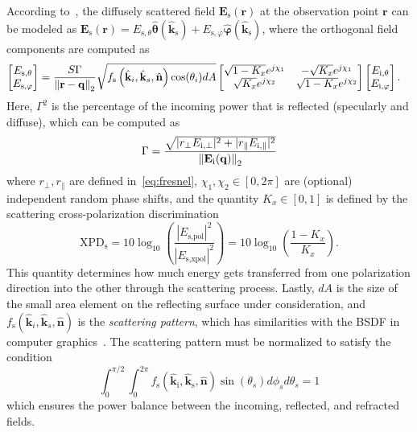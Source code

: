 According to~\cite[Eq.~9]{5979177}, the diffusely scattered field $\mathbf{E}_\text{s}(\mathbf{r})$ at the observation point $\mathbf{r}$ can be modeled as $\mathbf{E}_\text{s}(\mathbf{r})=E_{\text{s}, \theta}\hat{\boldsymbol{\theta}}(\hat{\mathbf{k}}_\text{s}) + E_{\text{s}, \varphi}\hat{\boldsymbol{\varphi}}(\hat{\mathbf{k}}_\text{s})$, where the orthogonal field components are computed as
\begin{align}
    \label{eq:scattered_field}
    \begin{bmatrix}E_{\text{s}, \theta} \\ E_{\text{s}, \varphi}
    \end{bmatrix} &= \frac{S \Gamma}{\left\lVert\mathbf{r} - \mathbf{q}
   \right\rVert_2}  \sqrt{f_\text{s}\left(\hat{\mathbf{k}}_i, \hat{\mathbf{k}}_s,
    \hat{\mathbf{n}}\right) \cos(\theta_i)dA}
    \begin{bmatrix} \sqrt{1-K_x}e^{j\chi_1} & -\sqrt{K_x}e^{j\chi_1} \\
    \sqrt{K_x}e^{j\chi_2} & \sqrt{1-K_x} e^{j\chi_2} \end{bmatrix}
    \begin{bmatrix}E_{\text{i}, \theta} \\ E_{\text{i}, \varphi}
    \end{bmatrix}.
\end{align}
Here, $\Gamma^2$ is the percentage of the incoming power that is reflected (specularly and diffuse), which can be computed as
\begin{equation}
    \Gamma = \frac{\sqrt{ |r_{\perp} E_{\text{i},\perp} |^2 + |r_{\parallel} E_{\text{i},\parallel} |^2}}
              {\left\lVert\mathbf{E}_\text{i}(\mathbf{q})\right\rVert_2}
\end{equation}
where $r_{\perp}, r_{\parallel}$ are defined in~\eqref{eq:fresnel}, $\chi_1, \chi_2 \in [0,2\pi]$ are (optional) independent random phase shifts, and the quantity $K_x\in[0,1]$ is defined by the scattering cross-polarization discrimination
\begin{equation}
    \label{eq:xpd}
    \text{XPD}_\text{s} = 10\log_{10}\left(\frac{|E_{\text{s}, \text{pol}}|^2}{|E_{\text{s}, \text{xpol}}|^2} \right) = 10\log_{10}\left(\frac{1-K_x}{K_x} \right).
\end{equation}
This quantity determines how much energy gets transferred from one polarization direction into the other through the scattering process. Lastly, $dA$ is the size of the small area element on the reflecting surface under consideration, and $f_\text{s}\left(\hat{\mathbf{k}}_i, \hat{\mathbf{k}}_s, \hat{\mathbf{n}}\right)$ is the \emph{scattering pattern}, which has similarities with the \gls{BSDF} in computer graphics~\cite[Ch.~4.3.1]{PBRT4e}.
The scattering pattern must be normalized to satisfy the condition
\begin{equation}
    \int_{0}^{\pi/2}\int_0^{2\pi} f_\text{s}\left(\hat{\mathbf{k}}_\text{i}, \hat{\mathbf{k}}_\text{s}, \hat{\mathbf{n}}\right) \sin(\theta_s) d\phi_s d\theta_s = 1
\end{equation}
which ensures the power balance between the incoming, reflected, and refracted fields.

